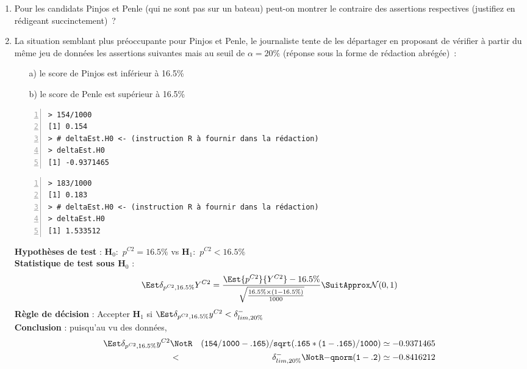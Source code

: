 \documentclass[10pt]{report}
\begin{document}
\begin{exercice}
\begin{enumerate}
\item Pour les candidats Pinjos et Penle (qui ne sont pas sur un bateau) peut-on montrer le contraire des assertions respectives (justifiez en rédigeant succinctement)~?


\item La situation semblant plus préoccupante pour Pinjos et Penle, le journaliste tente de les départager en proposant de vérifier à partir du même jeu de données les assertions suivantes mais au seuil de $\alpha=20\%$ (réponse sous la forme de rédaction abrégée)~:
\begin{itemize}
\item[a)] le score de Pinjos est inférieur à 16.5\%
\item[b)] le score de Penle est supérieur à 16.5\%
\end{itemize}






\IndicR
\begin{Verbatim}[frame=leftline,fontfamily=tt,fontshape=n,numbers=left]
> 154/1000
[1] 0.154
> # deltaEst.H0 <- (instruction R à fournir dans la rédaction)
> deltaEst.H0
[1] -0.9371465
\end{Verbatim}

\begin{Verbatim}[frame=leftline,fontfamily=tt,fontshape=n,numbers=left]
> 183/1000
[1] 0.183
> # deltaEst.H0 <- (instruction R à fournir dans la rédaction)
> deltaEst.H0
[1] 1.533512
\end{Verbatim}



\begin{Correction}

\noindent \textbf{Hypothèses de test} : $\mathbf{H}_0:$ $p^{C2}=16.5\%$ vs {\large $\mathbf{H}_1:$ $p^{C2}<16.5\%$}\\
\textbf{Statistique de test sous $\mathbf{H}_0$} :
  $$
  \Est{\delta_{p^{C2},16.5\%}}{Y^{C2}}= {\displaystyle \frac{\Est{p^{C2}}{Y^{C2}}-16.5\%}{
\sqrt{\frac{16.5\%\times (1-16.5\%)} {1000}}
}} 
  \SuitApprox \mathcal{N}(0,1)
  $$
\textbf{Règle de décision} : Accepter $\mathbf{H}_1$ si 
  $\Est{\delta_{p^{C2},16.5\%}}{y^{C2}} < \delta^-_{lim,20\%}$\\
\noindent \textbf{Conclusion} :
puisqu'au vu des données, 
  \begin{eqnarray*}
\Est{\delta_{p^{C2},16.5\%}}{y^{C2}} &\NotR&\mathtt{(154/1000-.165)/sqrt(.165*(1-.165)/1000)}\simeq -0.9371465\\& <  & \delta^-_{lim,20\%} \NotR \mathtt{-qnorm(1-.2)}\simeq-0.8416212
\end{eqnarray*}
  

\end{Correction}
\end{enumerate}
\end{exercice}
\end{document}
